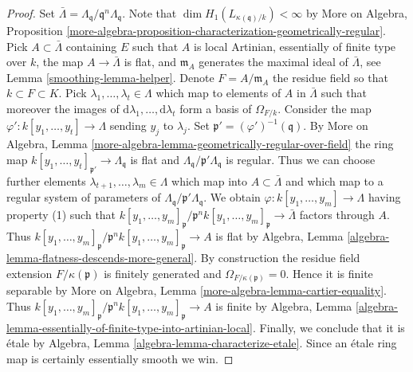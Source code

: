 \begin{proof}

Set $\bar \Lambda = \Lambda_\mathfrak q/\mathfrak q^n\Lambda_\mathfrak q$.
Note that $\dim H_1(L_{\kappa(\mathfrak q)/k}) < \infty$ by
More on Algebra, Proposition
\ref{more-algebra-proposition-characterization-geometrically-regular}.
Pick $A \subset \bar \Lambda$ containing $E$ such that $A$ is local
Artinian, essentially of finite type over $k$, the map
$A \to \bar \Lambda$ is flat, and $\mathfrak m_A$ generates the maximal
ideal of $\bar \Lambda$, see Lemma \ref{smoothing-lemma-helper}.
Denote $F = A/\mathfrak m_A$ the residue field so that $k \subset F \subset K$.
Pick $\lambda_1, \ldots, \lambda_t \in \Lambda$ which map
to elements of $A$ in $\bar \Lambda$ such that moreover the images
of $\text{d}\lambda_1, \ldots, \text{d}\lambda_t$ form a basis
of $\Omega_{F/k}$. Consider the map
$\varphi' : k[y_1, \ldots, y_t] \to \Lambda$ sending $y_j$ to $\lambda_j$.
Set $\mathfrak p' = (\varphi')^{-1}(\mathfrak q)$. By
More on Algebra, Lemma
\ref{more-algebra-lemma-geometrically-regular-over-field}
the ring map $k[y_1, \ldots, y_t]_{\mathfrak p'} \to \Lambda_\mathfrak q$
is flat and $\Lambda_\mathfrak q/\mathfrak p' \Lambda_\mathfrak q$ is
regular. Thus we can choose further elements
$\lambda_{t + 1}, \ldots, \lambda_m \in \Lambda$
which map into $A \subset \bar \Lambda$ and which
map to a regular system of parameters of
$\Lambda_\mathfrak q/\mathfrak p' \Lambda_\mathfrak q$.
We obtain $\varphi : k[y_1, \ldots, y_m] \to \Lambda$ having
property (1) such that
$k[y_1, \ldots, y_m]_\mathfrak p/\mathfrak p^n k[y_1, \ldots, y_m]_\mathfrak p
\to \bar\Lambda$
factors through $A$. Thus
$k[y_1, \ldots, y_m]_\mathfrak p/\mathfrak p^n k[y_1, \ldots, y_m]_\mathfrak p
\to A$ is flat by
Algebra, Lemma \ref{algebra-lemma-flatness-descends-more-general}.
By construction the residue field extension $F/\kappa(\mathfrak p)$
is finitely generated and $\Omega_{F/\kappa(\mathfrak p)} = 0$. Hence it is
finite separable by
More on Algebra, Lemma \ref{more-algebra-lemma-cartier-equality}.
Thus
$k[y_1, \ldots, y_m]_\mathfrak p/\mathfrak p^n k[y_1, \ldots, y_m]_\mathfrak p
\to A$
is finite by Algebra, Lemma
\ref{algebra-lemma-essentially-of-finite-type-into-artinian-local}.
Finally, we conclude that it is \'etale by
Algebra, Lemma \ref{algebra-lemma-characterize-etale}.
Since an \'etale ring map is certainly essentially smooth we win.
\end{proof}

